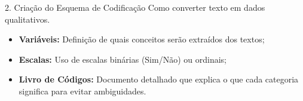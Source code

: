 \begin{frame}{2. Criação do Esquema de Codificação}
    \justifying
    Como converter texto em dados qualitativos.

    \vspace{0.8em}
    \begin{itemize}
        \item \textbf{Variáveis:} Definição de quais conceitos serão extraídos dos textos;
        \item \textbf{Escalas:} Uso de escalas binárias (Sim/Não) ou ordinais;
        \item \textbf{Livro de Códigos:} Documento detalhado que explica o que cada categoria significa para evitar ambiguidades.
    \end{itemize}

\end{frame}